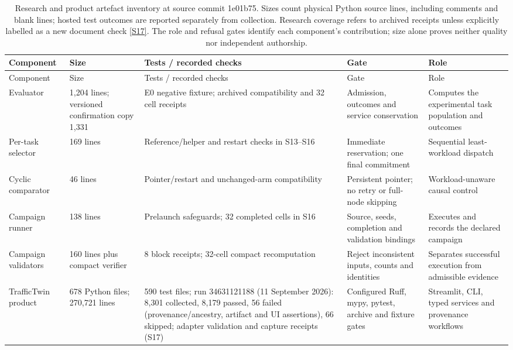 \documentclass[12pt,a4paper]{article}
\begin{document}
\begingroup
\singlespacing\footnotesize\setlength{\tabcolsep}{3pt}
\renewcommand{\thetable}{A1}
\begin{xltabular}{\textwidth}{@{}YYYYY@{}}
\caption[Software components and gates]{Research and product artefact inventory at source commit 1e01b75. Sizes count physical Python source lines, including comments and blank lines; hosted test outcomes are reported separately from collection. Research coverage refers to archived receipts unless explicitly labelled as a new document check \hyperref[source-s17]{[S17]}. The role and refusal gates identify each component's contribution; size alone proves neither quality nor independent authorship.}\label{tab:A1} \\
\toprule
Component & Size & Tests / recorded checks & Gate & Role \\
\midrule\endfirsthead
\toprule
Component & Size & Tests / recorded checks & Gate & Role \\
\midrule\endhead
\bottomrule\endfoot
Evaluator & 1,204 lines; versioned confirmation copy 1,331 & E0 negative fixture; archived compatibility and 32 cell receipts & Admission, outcomes and service conservation & Computes the experimental task population and outcomes \\
Per-task selector & 169 lines & Reference/helper and restart checks in S13--S16 & Immediate reservation; one final commitment & Sequential least-workload dispatch \\
Cyclic comparator & 46 lines & Pointer/restart and unchanged-arm compatibility & Persistent pointer; no retry or full-node skipping & Workload-unaware causal control \\
Campaign runner & 138 lines & Prelaunch safeguards; 32 completed cells in S16 & Source, seeds, completion and validation bindings & Executes and records the declared campaign \\
Campaign validators & 160 lines plus compact verifier & 8 block receipts; 32-cell compact recomputation & Reject inconsistent inputs, counts and identities & Separates successful execution from admissible evidence \\
TrafficTwin product & 678 Python files; 270,721 lines & 590 test files; run 34631121188 (11 September 2026): 8,301 collected, 8,179 passed, 56 failed (provenance/ancestry, artifact and UI assertions), 66 skipped; adapter validation and capture receipts (S17) & Configured Ruff, mypy, pytest, archive and fixture gates & Streamlit, CLI, typed services and provenance workflows \\
\end{xltabular}
\endgroup
\end{document}
